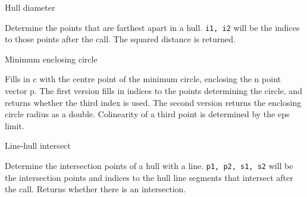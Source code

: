 \begin{algorithm}{Hull diameter}

Determine the points that are farthest apart in a hull.
{\tt i1, i2} will be the indices to those points after the call.
The squared distance is returned.
\end{algorithm}

\begin{algorithm}{Minimum enclosing circle}

Fills in c with the centre point of the minimum circle, enclosing the
n point vector p. The first version fills in indices to the points
determining the circle, and returns whether the third index is used.
The second version returns the enclosing circle radius as a double.
Colinearity of a third point is determined by the eps limit.
\end{algorithm}

\begin{algorithm}{Line-hull intersect}

Determine the intersection points of a hull with a line.
{\tt p1, p2, s1, s2} will be the intersection points and indices to the hull
line segments that intersect after the call. Returns whether there is an
intersection.
\end{algorithm}
